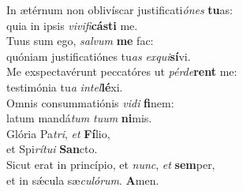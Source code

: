 \oddverse In ætérnum non oblivíscar justificati\textit{ó}\textit{nes} \textbf{tu}as:~\*\\
\oddverse quia in ipsis \textit{vi}\textit{vi}\textit{fi}\textbf{cá}\textbf{sti} me.\\
\evenverse Tuus sum ego, \textit{sal}\textit{vum} \textbf{me} fac:~\*\\
\evenverse quóniam justificatiónes tu\textit{as} \textit{ex}\textit{qui}\textbf{sí}vi.\\
\oddverse Me exspectavérunt peccatóres ut \textit{pér}\textit{de}\textbf{rent} me:~\*\\
\oddverse testimónia tu\textit{a} \textit{in}\textit{tel}\textbf{lé}xi.\\
\evenverse Omnis consummatiónis \textit{vi}\textit{di} \textbf{fi}nem:~\*\\
\evenverse latum mandá\textit{tum} \textit{tu}\textit{um} \textbf{ni}mis.\\
\oddverse Glória Pa\textit{tri}, \textit{et} \textbf{Fí}lio,~\*\\
\oddverse et Spi\textit{rí}\textit{tu}\textit{i} \textbf{San}cto.\\
\evenverse Sicut erat in princípio, et \textit{nunc}, \textit{et} \textbf{sem}per,~\*\\
\evenverse et in sǽcula sæ\textit{cu}\textit{ló}\textit{rum}. \textbf{A}men.\\
